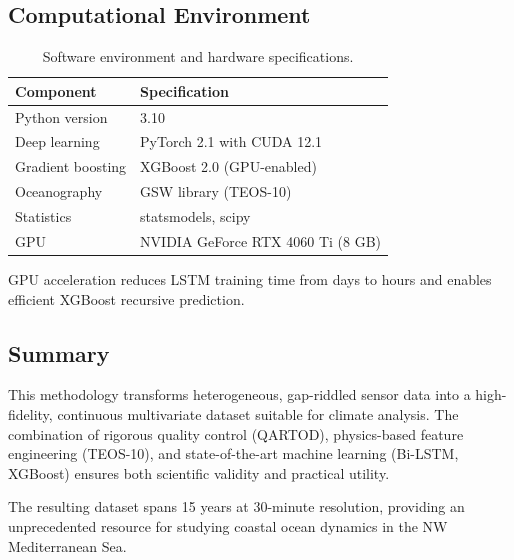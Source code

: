 \documentclass[12pt,a4paper]{article}
\begin{document}
\subsection{Computational Environment}
\label{sec:environment}

\begin{table}[H]
\centering
\caption{Software environment and hardware specifications.}
\label{tab:environment}
\begin{tabular}{@{}ll@{}}
\toprule
\textbf{Component} & \textbf{Specification} \\ \midrule
Python version & 3.10 \\
Deep learning & PyTorch 2.1 with CUDA 12.1 \\
Gradient boosting & XGBoost 2.0 (GPU-enabled) \\
Oceanography & GSW library (TEOS-10) \\
Statistics & statsmodels, scipy \\
GPU & NVIDIA GeForce RTX 4060 Ti (8 GB) \\
\bottomrule
\end{tabular}
\end{table}

GPU acceleration reduces LSTM training time from days to hours and enables efficient XGBoost recursive prediction.

\subsection{Summary}
\label{sec:summary}

This methodology transforms heterogeneous, gap-riddled sensor data into a high-fidelity, continuous multivariate dataset suitable for climate analysis. The combination of rigorous quality control (QARTOD), physics-based feature engineering (TEOS-10), and state-of-the-art machine learning (Bi-LSTM, XGBoost) ensures both scientific validity and practical utility.

The resulting dataset spans 15 years at 30-minute resolution, providing an unprecedented resource for studying coastal ocean dynamics in the NW Mediterranean Sea.
\end{document}
